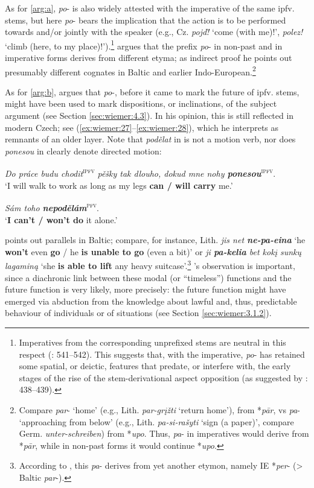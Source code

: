 \documentclass[output=paper,colorlinks,citecolor=brown]{langscibook}
\begin{document}
As for \ref{arg:a}, \textit{po}- is also widely attested with the imperative of the same ipfv. stems, but here \textit{po}- bears the implication that the action is to be performed towards and/or jointly with the speaker (e.g., Cz. \textit{pojď!} ‘come (with me)!’, \textit{polez!} ‘climb (here, to my place)!’).\footnote{\label{fn:35}Imperatives from the corresponding unprefixed stems are neutral in this respect (\cite{Bondarko1961}: 541--542). This suggests that, with the imperative, \textit{po}- has retained some spatial, or deictic, features that predate, or interfere with, the early stages of the rise of the stem\hyp{}derivational aspect opposition (as suggested by \cite{Machek1962}: 438--439).} \citet[438--439]{Machek1962} argues that the prefix \textit{po}- in non-past and in imperative forms derives from different etyma; as indirect proof he points out presumably different cognates in Baltic and earlier Indo-European.\footnote{Compare \textit{par}- ‘home’ (e.g., Lith. \textit{par-grįžti} ‘return home’), from *\textit{pār}, vs \textit{pa}- ‘approaching from below’ (e.g., Lith. \textit{pa-si-rašyti} ‘sign (a paper)’, compare Germ. \textit{unter-schreiben}) from *\textit{upo}. Thus, \textit{pa}- in imperatives would derive from *\textit{pār}, while in non-past forms it would continue *\textit{upo}.}

As for \ref{arg:b}, \citet[439--441]{Machek1962} argues that \textit{po}-, before it came to mark the future of ipfv. stems, might have been used to mark dispositions, or inclinations, of the subject argument (see Section \ref{sec:wiemer:4.3}). In his opinion, this is still reflected in modern Czech; see (\ref{ex:wiemer:27}--\ref{ex:wiemer:28}), which he interprets as remnants of an older layer. Note that \textit{podělat} in  is not a motion verb, nor does \textit{ponesou} in  clearly denote directed motion:


\ea \label{ex:wiemer:27} 
    \textit{Do práce budu chodit}\textsuperscript{\textsc{ipfv}} \textit{pěšky tak dlouho, dokud mne nohy \textbf{ponesou}}\textsuperscript{\textsc{ipfv}}.\\
    ‘I will walk to work as long as my legs \textbf{can / will carry} me.’
\z

\ea \label{ex:wiemer:28} 
    \textit{Sám toho \textbf{nepodělám}}\textsuperscript{\textsc{pfv}}.\\
    ‘\textbf{I can’t / won’t do} it alone.’
\z

\citeauthor{Machek1962} points out parallels in Baltic; compare, for instance, Lith. \textit{jis net \textbf{ne-pa-eina}} ‘he \textbf{won’t }even \textbf{go} / he \textbf{is unable to go} (even a bit)’ or \textit{ji \textbf{pa-kelia} bet kokį sunkų lagaminą} ‘she \textbf{is able to lift }any heavy suitcase’.\footnote{According to \citet[441]{Machek1962}, this \textit{pa}- derives from yet another etymon, namely IE *\textit{per}- (> Baltic \textit{par}-).} \citeauthor{Machek1962}'s observation is important, since a diachronic link between these modal (or “timeless”) functions and the future function is very likely, more precisely: the future function might have emerged via abduction from the knowledge about lawful and, thus, predictable behaviour of individuals or of situations (see Section \ref{sec:wiemer:3.1.2}).
\end{document}
